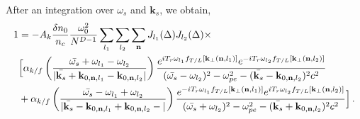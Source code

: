 \documentclass[
 reprint,
 amsmath,amssymb,
 aps,
]{revtex4-1}
\begin{document}
\begin{widetext}
After an integration over $\omega_s$ and $\mathbf{k}_s$, we obtain,
\begin{align}
   1& = -A_k \frac{\delta n_0}{n_c}\frac{\omega_0^2}{N^{D-1}
   } 
    \sum_{l_1}  \sum_{l_2} \sum_{\mathbf{n}}    J_{l_1}(\Delta)J_{l_2}(\Delta)\times \nonumber \\
  & \Big[  
  \alpha_{k/f}\left(\frac{\Bar{\omega_s}+\omega_{l_1}-\omega_{l_2}}
  {\vert\Bar{\mathbf{k}_s}+\mathbf{k}_{0,\mathbf{n},l_1}-\mathbf{k}_{0,\mathbf{n},l_2} \vert}
  \right) 
     \frac{  e^{iT_{r} \omega_{l_1}f_{T/L}[\mathbf{k}_\perp(\mathbf{n},l_1)]  }
  e^{-iT_{r}  \omega_{l_2}f_{T/L}[\mathbf{k}_\perp(\mathbf{n},l_2)]  }
     }{(\Bar{\omega_s}-\omega_{l_2})^2 - \omega_{pe}^2 -(\Bar{\mathbf{k}_s}- \mathbf{k}_{0,\mathbf{n},l_2})^2c^2}
      \nonumber\\&
   +\alpha_{k/f}\left(\frac{\Bar{\omega_s}-\omega_{l_1}+\omega_{l_2}}
   {\vert\Bar{\mathbf{k}_s}-\mathbf{k}_{0,\mathbf{n},l_1}+\mathbf{k}_{0,\mathbf{n},l_2}-\vert} 
   \right)  \frac{   e^{-iT_{r} \omega_{l_1}f_{T/L}[\mathbf{k}_\perp(\mathbf{n},l_1)]  }
  e^{iT_{r}  \omega_{l_2}f_{T/L}[\mathbf{k}_\perp(\mathbf{n},l_2)]  }
   }{(\Bar{\omega_s}+\omega_{l_2})^2 - \omega_{pe}^2 -(\Bar{\mathbf{k}_s}+ \mathbf{k}_{0,\mathbf{n},l_2})^2c^2} 
   \Big]
   \, .\label{eq:fssd4}
\end{align}


\end{widetext}
\end{document}

